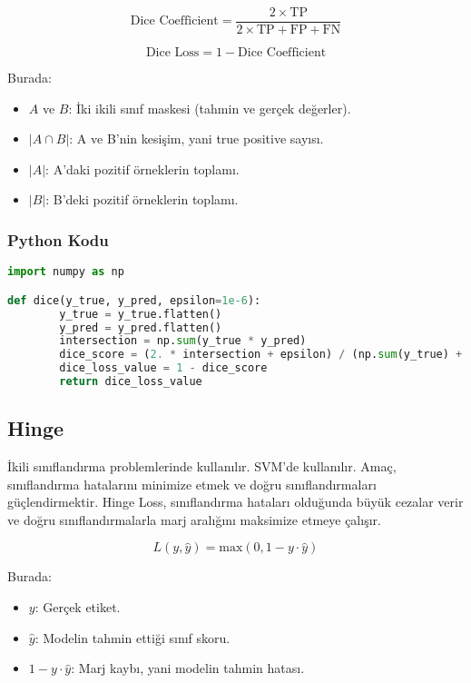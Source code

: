 \[ \text{Dice Coefficient} = \frac{2 \times \text{TP}}{2 \times \text{TP} + \text{FP} + \text{FN}} \]

\[ \text{Dice Loss} = 1 - \text{Dice Coefficient} \]

Burada:

\begin{itemize}
    \item $A$ ve $B$: İki ikili sınıf maskesi (tahmin ve gerçek değerler).
    \item $| A \cap B |$: A ve B'nin kesişim, yani true positive sayısı.
    \item $|A|$: A'daki pozitif örneklerin toplamı.
    \item $|B|$: B'deki pozitif örneklerin toplamı.
\end{itemize}

\subsubsection{Python Kodu}

\begin{lstlisting}[language=Python]
import numpy as np

def dice(y_true, y_pred, epsilon=1e-6):
        y_true = y_true.flatten()
        y_pred = y_pred.flatten()
        intersection = np.sum(y_true * y_pred)
        dice_score = (2. * intersection + epsilon) / (np.sum(y_true) + np.sum(y_pred) + epsilon)
        dice_loss_value = 1 - dice_score
        return dice_loss_value
\end{lstlisting}

\newpage

\subsection{Hinge}

İkili sınıflandırma problemlerinde kullanılır. SVM'de kullanılır.  Amaç, sınıflandırma hatalarını minimize etmek ve doğru sınıflandırmaları güçlendirmektir. Hinge Loss, sınıflandırma hataları olduğunda büyük cezalar verir ve doğru sınıflandırmalarla marj aralığını maksimize etmeye çalışır.

\[ L(y, \hat{y}) = \text{max}(0, 1 - y \cdot \hat{y}) \]

Burada:

\begin{itemize}
    \item $y$: Gerçek etiket.
    \item $\hat{y}$: Modelin tahmin ettiği sınıf skoru.
    \item $1 - y \cdot \hat{y}$: Marj kaybı, yani modelin tahmin hatası.
\end{itemize}

